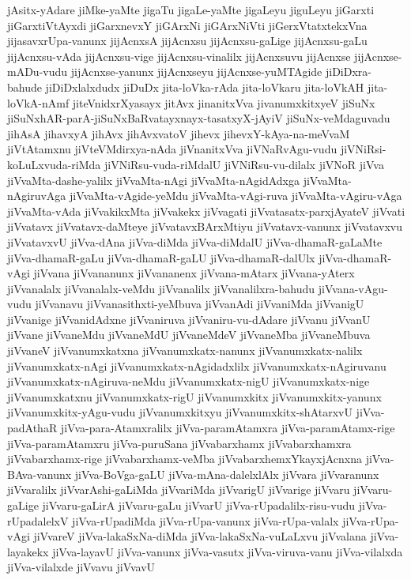{jAsitx-yAdare
jiMke-yaMte
jigaTu
jigaLe-yaMte
jigaLeyu
jiguLeyu
jiGarxti
jiGarxtiVtAyxdi
jiGarxnevxY
jiGArxNi
jiGArxNiVti
jiGerxVtatxtekxVna
jijasavxrUpa-vanunx
jijAcnxsA
jijAcnxsu
jijAcnxsu-gaLige
jijAcnxsu-gaLu
jijAcnxsu-vAda
jijAcnxsu-vige
jijAcnxsu-vinalilx
jijAcnxsuvu
jijAcnxse
jijAcnxse-mADu-vudu
jijAcnxse-yanunx
jijAcnxseyu
jijAcnxse-yuMTAgide
jiDiDxra-bahude
jiDiDxlalxdudx
jiDuDx
jita-loVka-rAda
jita-loVkaru
jita-loVkAH
jita-loVkA-nAmf
jiteVnidxrXyasayx
jitAvx
jinanitxVva
jivanumxkitxyeV
jiSuNx
jiSuNxhAR-parA-jiSuNxBaRvatayxnayx-tasatxyX-jAyiV
jiSuNx-veMdaguvadu
jihAsA
jihavxyA
jihAvx
jihAvxvatoV
jihevx
jihevxY-kAya-na-meVvaM
jiVtAtamxnu
jiVteVMdirxya-nAda
jiVnanitxVva
jiVNaRvAgu-vudu
jiVNiRsi-koLuLxvuda-riMda
jiVNiRsu-vuda-riMdalU
jiVNiRsu-vu-dilalx
jiVNoR
jiVva
jiVvaMta-dashe-yalilx
jiVvaMta-nAgi
jiVvaMta-nAgidAdxga
jiVvaMta-nAgiruvAga
jiVvaMta-vAgide-yeMdu
jiVvaMta-vAgi-ruva
jiVvaMta-vAgiru-vAga
jiVvaMta-vAda
jiVvakikxMta
jiVvakekx
jiVvagati
jiVvatasatx-parxjAyateV
jiVvati
jiVvatavx
jiVvatavx-daMteye
jiVvatavxBArxMtiyu
jiVvatavx-vanunx
jiVvatavxvu
jiVvatavxvU
jiVva-dAna
jiVva-diMda
jiVva-diMdalU
jiVva-dhamaR-gaLaMte
jiVva-dhamaR-gaLu
jiVva-dhamaR-gaLU
jiVva-dhamaR-dalUlx
jiVva-dhamaR-vAgi
jiVvana
jiVvananunx
jiVvananenx
jiVvana-mAtarx
jiVvana-yAterx
jiVvanalalx
jiVvanalalx-veMdu
jiVvanalilx
jiVvanalilxra-bahudu
jiVvana-vAgu-vudu
jiVvanavu
jiVvanasithxti-yeMbuva
jiVvanAdi
jiVvaniMda
jiVvanigU
jiVvanige
jiVvanidAdxne
jiVvaniruva
jiVvaniru-vu-dAdare
jiVvanu
jiVvanU
jiVvane
jiVvaneMdu
jiVvaneMdU
jiVvaneMdeV
jiVvaneMba
jiVvaneMbuva
jiVvaneV
jiVvanumxkatxna
jiVvanumxkatx-nanunx
jiVvanumxkatx-nalilx
jiVvanumxkatx-nAgi
jiVvanumxkatx-nAgidadxlilx
jiVvanumxkatx-nAgiruvanu
jiVvanumxkatx-nAgiruva-neMdu
jiVvanumxkatx-nigU
jiVvanumxkatx-nige
jiVvanumxkatxnu
jiVvanumxkatx-rigU
jiVvanumxkitx
jiVvanumxkitx-yanunx
jiVvanumxkitx-yAgu-vudu
jiVvanumxkitxyu
jiVvanumxkitx-shAtarxvU
jiVva-padAthaR
jiVva-para-Atamxralilx
jiVva-paramAtamxra
jiVva-paramAtamx-rige
jiVva-paramAtamxru
jiVva-puruSana
jiVvabarxhamx
jiVvabarxhamxra
jiVvabarxhamx-rige
jiVvabarxhamx-veMba
jiVvabarxhemxYkayxjAcnxna
jiVva-BAva-vanunx
jiVva-BoVga-gaLU
jiVva-mAna-dalelxlAlx
jiVvara
jiVvaranunx
jiVvaralilx
jiVvarAshi-gaLiMda
jiVvariMda
jiVvarigU
jiVvarige
jiVvaru
jiVvaru-gaLige
jiVvaru-gaLirA
jiVvaru-gaLu
jiVvarU
jiVva-rUpadalilx-risu-vudu
jiVva-rUpadalelxV
jiVva-rUpadiMda
jiVva-rUpa-vanunx
jiVva-rUpa-valalx
jiVva-rUpa-vAgi
jiVvareV
jiVva-lakaSxNa-diMda
jiVva-lakaSxNa-vuLaLxvu
jiVvalana
jiVva-layakekx
jiVva-layavU
jiVva-vanunx
jiVva-vasutx
jiVva-viruva-vanu
jiVva-vilalxda
jiVva-vilalxde
jiVvavu
jiVvavU
}
